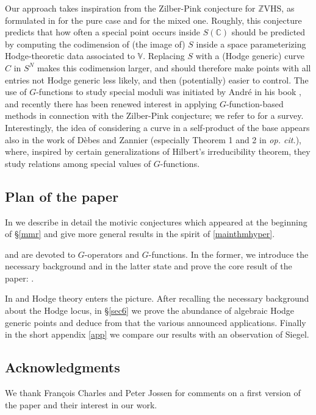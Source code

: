 \documentclass[10pt]{article}
\numberwithin{equation}{section}
\theoremstyle{plain}
\theoremstyle{definition}
\theoremstyle{remark}
\begin{document}
\medskip

Our approach takes inspiration from the Zilber-Pink conjecture for $\mathbb{Z}$VHS, as formulated in \cite{2021arXiv210708838B} for the pure case and \cite{2024arXiv240616628B} for the mixed one. Roughly, this conjecture predicts that how often a special point occurs inside $S(\mathbb{C})$ should be predicted by computing the codimension of (the image of) $S$ inside a space parameterizing Hodge-theoretic data associated to $\mathbb{V}$. Replacing $S$ with a (Hodge generic) curve $C$ in $S^{N}$ makes this codimension larger, and should therefore make points with all entries not Hodge generic less likely, and then (potentially) easier to control. The use of $G$-functions to study special moduli was initiated by Andr\'e in his book \cite{zbMATH00041964}, and recently there has been renewed interest in applying $G$-function-based methods in connection with the Zilber-Pink conjecture; we refer to \cite{2025arXiv250109867A} for a survey. Interestingly, the idea of considering a curve in a self-product of the base appears also in the work of Dèbes and Zannier \cite{zbMATH01096013} (especially Theorem 1 and 2 in \emph{op. cit.}), where, inspired by certain generalizations of Hilbert’s irreducibility theorem, they study relations among special values of $G$-functions.


\subsection{Plan of the paper}
In  we describe in detail the motivic conjectures which appeared at the beginning of \S \ref{mmr} and give more general results in the spirit of \autoref{mainthmhyper}.

 and   are devoted to $G$-operators and $G$-functions. In  the former, we introduce the necessary background and in the latter state and prove the core result of the paper: .


In  and  Hodge theory enters the picture. After recalling the necessary background about the Hodge locus, in \S \ref{sec6} we prove the abundance of algebraic Hodge generic points and deduce from that the various announced applications. Finally in the short appendix \ref{app} we compare our results with an observation of Siegel.



\subsection*{Acknowledgments}
We thank Fran\c{c}ois Charles and Peter Jossen for comments on a first version of the paper and their interest in our work.
\end{document}
